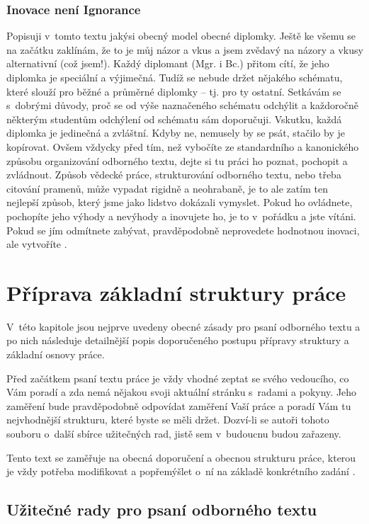 \subsection*{Inovace není Ignorance}

Popisuji v~tomto textu jakýsi obecný model obecné diplomky. Ještě ke všemu se na začátku zaklínám, že to je můj názor a vkus a jsem zvědavý na názory a vkusy alternativní (což jsem!). Každý diplomant (Mgr. i Bc.) přitom cítí, že jeho diplomka je speciální a výjimečná. Tudíž se nebude držet nějakého schématu, které slouží pro běžné a průměrné diplomky -- tj. pro ty ostatní. Setkávám se s~dobrými důvody, proč se od výše naznačeného schématu odchýlit a každoročně některým studentům odchýlení od schématu sám doporučuji. Vskutku, každá diplomka je jedinečná a zvláštní. Kdyby ne, nemusely by se psát, stačilo by je kopírovat. Ovšem vždycky před tím, než vybočíte ze standardního a kanonického způsobu organizování odborného textu, dejte si tu práci ho poznat, pochopit a zvládnout. Způsob vědecké práce, strukturování odborného textu, nebo třeba citování pramenů, může vypadat rigidně a neohrabaně, je to ale zatím ten nejlepší způsob, který jsme jako lidstvo dokázali vymyslet. Pokud ho ovládnete, pochopíte jeho výhody a nevýhody a inovujete ho, je to v~pořádku a jste vítáni. Pokud se jím odmítnete zabývat, pravděpodobně neprovedete hodnotnou inovaci, ale vytvoříte .


\chapter{Příprava základní struktury práce} 
\label{struktura}

V~této kapitole jsou nejprve uvedeny obecné zásady pro psaní odborného textu a po nich následuje detailnější popis doporučeného postupu přípravy struktury a základní osnovy práce.

Před začátkem psaní textu práce je vždy vhodné zeptat se svého vedoucího, co Vám poradí a zda nemá nějakou svoji aktuální stránku s~radami a pokyny. Jeho zaměření bude pravděpodobně odpovídat zaměření Vaší práce a poradí Vám tu nejvhodnější strukturu, které byste se měli držet. Dozví-li se autoři tohoto souboru o~další sbírce užitečných rad, jistě sem v~budoucnu budou zařazeny.

Tento text se zaměřuje na obecná doporučení a obecnou strukturu práce, kterou je vždy potřeba  modifikovat a popřemýšlet o~ní na základě konkrétního zadání \cite{Cernocky}.

\section{Užitečné rady pro psaní odborného textu}

